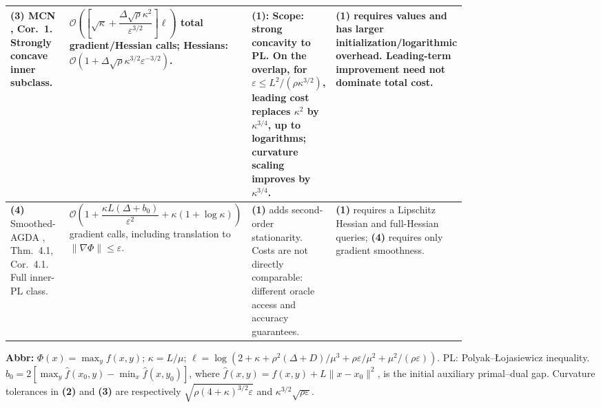 \begin{table}[tp]
\begin{threeparttable}
\begin{tabularx}{\linewidth}{@{}>{\raggedright\arraybackslash}p{0.20\linewidth}>{\raggedright\arraybackslash}p{0.32\linewidth}>{\raggedright\arraybackslash}p{0.25\linewidth}>{\raggedright\arraybackslash}X@{}}
\midrule
\textbf{(3)} MCN \citep{ncplLuo2022}, Cor.~1. Strongly concave inner subclass.
& $\mathcal{O}\!\left(\left[\sqrt\kappa+\dfrac{\Delta\sqrt\rho\kappa^2}{\varepsilon^{3/2}}\right]\ell\right)$ total gradient/Hessian calls; Hessians: $\mathcal{O}(1+\Delta\sqrt\rho\kappa^{3/2}\varepsilon^{-3/2})$.
& \textbf{(1)}: Scope: strong concavity to PL. On the overlap, for $\varepsilon\le L^2/(\rho\kappa^{3/2})$, leading cost replaces $\kappa^2$ by $\kappa^{3/4}$, up to logarithms; curvature scaling improves by $\kappa^{3/4}$.
& \textbf{(1)} requires values and has larger initialization/logarithmic overhead. Leading-term improvement need not dominate total cost. \\
\midrule
\textbf{(4)} Smoothed-AGDA \citep{ncplYang2022}, Thm.~4.1, Cor.~4.1. Full inner-PL class.
& $\mathcal{O}\!\left(1+\dfrac{\kappa L(\Delta+b_0)}{\varepsilon^2}+\kappa(1+\log\kappa)\right)$ gradient calls, including translation to $\|\nabla\Phi\|\le\varepsilon$.
& \textbf{(1)} adds second-order stationarity. Costs are not directly comparable: different oracle access and accuracy guarantees.
& \textbf{(1)} requires a Lipschitz Hessian and full-Hessian queries; \textbf{(4)} requires only gradient smoothness. \\
\bottomrule
\end{tabularx}
\begin{tablenotes}[flushleft]\footnotesize
\item[] \textbf{Abbr:} $\Phi(x)=\max_y f(x,y)$; $\kappa=L/\mu$; $\ell=\log(2+\kappa+\rho^2(\Delta+D)/\mu^3+\rho\varepsilon/\mu^2+\mu^2/(\rho\varepsilon))$. PL: Polyak--\L{}ojasiewicz inequality. $b_0=2[\max_y\widehat f(x_0,y)-\min_x\widehat f(x,y_0)]$, where $\widehat f(x,y)=f(x,y)+L\|x-x_0\|^2$, is the initial auxiliary primal--dual gap. Curvature tolerances in \textbf{(2)} and \textbf{(3)} are respectively $\sqrt{\rho(4+\kappa)^{3/2}\varepsilon}$ and $\kappa^{3/2}\sqrt{\rho\varepsilon}$.
\end{tablenotes}
\end{threeparttable}
\end{table}
\clearpage
